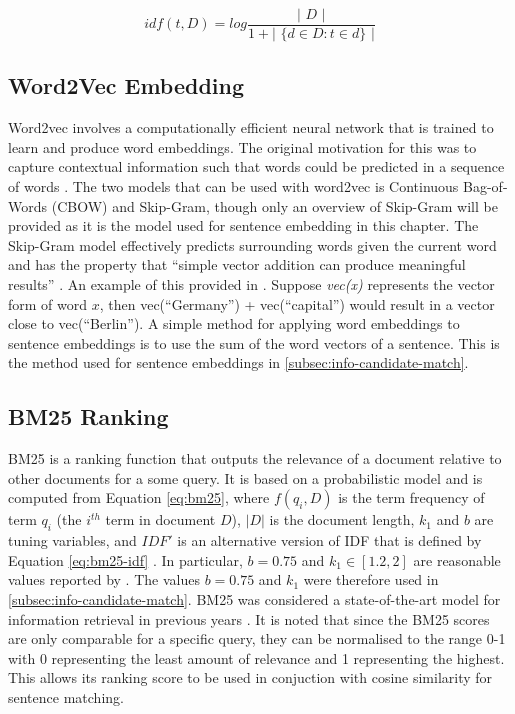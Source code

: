 \begin{equation}
\label{idf}
idf( t, D ) = log \frac{ \text{| } D \text{ |} }{ 1 + \text{| } \{ d \in D : t \in d \} \text{ |} }
\end{equation}

\subsection{Word2Vec Embedding}
\label{subsec:info-w2v}
Word2vec involves a computationally efficient neural network that is trained to learn and produce word embeddings. The original motivation for this was to capture contextual information such that words could be predicted in a sequence of words \cite{mikolov2013efficient}. The two models that can be used with word2vec is Continuous Bag-of-Words (CBOW) and Skip-Gram, though only an overview of Skip-Gram will be provided as it is the model used for sentence embedding in this chapter. The Skip-Gram model effectively predicts surrounding words given the current word and has the property that ``simple vector addition can produce meaningful results'' \cite{mikolov2013distributed}. An example of this provided in \cite{mikolov2013distributed}. Suppose \textit{vec(x)} represents the vector form of word $x$, then vec(``Germany'') + vec(``capital'') would result in a vector close to vec(``Berlin''). A simple method for applying word embeddings to sentence embeddings is to use the sum of the word vectors of a sentence. This is the method used for sentence embeddings in \ref{subsec:info-candidate-match}.

\subsection{BM25 Ranking}
\label{subsec:info-bm25}
BM25 is a ranking function that outputs the relevance of a document relative to other documents for a some query. It is based on a probabilistic model and is computed from Equation \ref{eq:bm25}, where $f(q_i, D)$ is the term frequency of term $q_i$ (the $i^{th}$ term in document $D$), $|D|$ is the document length, $k_1$ and $b$ are tuning variables, and $IDF'$ is an alternative version of IDF that is defined by Equation \ref{eq:bm25-idf} \cite{Manning:2008:IIR:1394399}. In particular, $b=0.75$ and $k_1 \in [1.2,2]$ are reasonable values reported by \citeauthor{Manning:2008:IIR:1394399}. The values $b=0.75$ and $k_1$ were therefore used in \ref{subsec:info-candidate-match}. BM25 was considered a state-of-the-art model for information retrieval in previous years \cite{perez2009integrating}. It is noted that since the BM25 scores are only comparable for a specific query, they can be normalised to the range 0-1 with 0 representing the least amount of relevance and 1 representing the highest. This allows its ranking score to be used in conjuction with cosine similarity for sentence matching.

